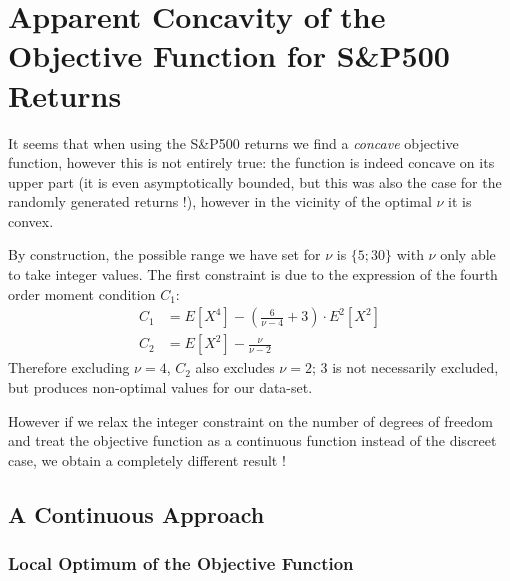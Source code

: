 \chapter{Apparent Concavity of the Objective Function for S\&P500 Returns}



It seems that when using the S\&P500 returns we find a \emph{concave} objective function, however this is not entirely true: the function is indeed concave on its upper part (it is even asymptotically bounded, but this was also the case for the randomly generated returns !), however in the vicinity of the optimal $\nu$ it is convex. \smallskip
\par
By construction, the possible range we have set for $\nu$ is $\{5;30\}$ with $\nu$ only able to take integer values. The first constraint is due to the expression of the fourth order moment condition $C_1$:
\begin{align*}
    C_1 &= E\left[X^4\right] - \left(\frac{6}{\nu-4}+3\right)\cdot E^2\left[X^2\right] \\
    C_2 &= E\left[X^2\right] - \frac{\nu}{\nu - 2}
\end{align*}
Therefore excluding $\nu = 4$, $C_2$ also excludes $\nu=2$; $3$ is not necessarily excluded, but produces non-optimal values for our data-set.
\smallskip\par
However if we relax the integer constraint on the number of degrees of freedom and treat the objective function as a continuous function instead of the discreet case, we obtain a completely different result !


\section{A Continuous Approach}

\subsection{Local Optimum of the Objective Function}

